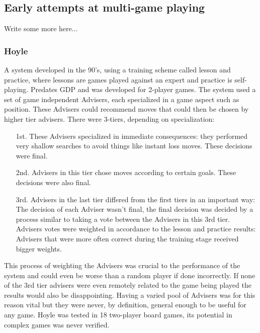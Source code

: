 \subsection{Early attempts at multi-game playing}

Write some more here...

\subsubsection{Hoyle}
A system developed in the 90’s, using a training scheme called lesson and practice, where lessons are games played against an expert and practice is self-playing. Predates GDP and was developed for 2-player games. The system used a set of game independent Advisers, each specialized in a game aspect such as position. These Advisers could recommend moves that could then be chosen by higher tier advisers. There were 3-tiers, depending on specialization:

\begin{enumerate}

\item [1st.] These Advisers specialized in immediate consequences: they performed very shallow searches to avoid things like instant loss moves. These decisions were final.

\item [2nd.] Advisers in this tier chose moves according to certain goals. These decisions were also final.

\item [3rd.] Advisers in the last tier differed from the first tiers in an important way: The decision of each Adviser wasn’t final, the final decision was decided by a process similar to taking a vote between the Advisers in this 3rd tier. Advisers votes were weighted in accordance to the lesson and practice results: Advisers that were more often correct during the training stage received bigger weights. 

\end{enumerate}
This process of weighting the Advisers was crucial to the performance of the system and could even be worse than a random player if done incorrectly. If none of the 3rd tier advisers were even remotely related to the game being played the results would also be disappointing. Having a varied pool of Advisers was for this reason vital but they were never, by definition, general enough to be useful for any game. Hoyle was tested in 18 two-player board games, its potential in complex games was never verified.


